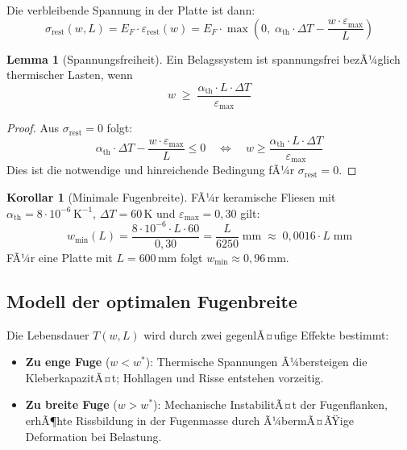 ﻿\documentclass[a4paper,12pt]{article}
\theoremstyle{definition}
\newtheorem{lemma}{Lemma}
\newtheorem{korollar}{Korollar}
\begin{document}
Die verbleibende Spannung in der Platte ist dann:
\[
\sigma_{\text{rest}}(w, L) = E_F \cdot \varepsilon_{\text{rest}}(w)
= E_F \cdot \max\!\left(0,\;\alpha_{\text{th}} \cdot \Delta T - \frac{w \cdot \varepsilon_{\max}}{L}\right)
\]

\begin{lemma}[Spannungsfreiheit]
	\label{lem:spannungsfreiheit}
	Ein Belagssystem ist spannungsfrei bezÃ¼glich thermischer Lasten, wenn
	\[
	w \;\geq\; \frac{\alpha_{\text{th}} \cdot L \cdot \Delta T}{\varepsilon_{\max}}
	\]
\end{lemma}

\begin{proof}
	Aus $\sigma_{\text{rest}} = 0$ folgt:
	\[
	\alpha_{\text{th}} \cdot \Delta T - \frac{w \cdot \varepsilon_{\max}}{L} \leq 0
	\quad\Longleftrightarrow\quad
	w \geq \frac{\alpha_{\text{th}} \cdot L \cdot \Delta T}{\varepsilon_{\max}}
	\]
	Dies ist die notwendige und hinreichende Bedingung fÃ¼r
	$\sigma_{\text{rest}} = 0$.
\end{proof}

\begin{korollar}[Minimale Fugenbreite]
	\label{kor:minbreite}
	FÃ¼r keramische Fliesen mit $\alpha_{\text{th}} = 8 \cdot 10^{-6}\,\text{K}^{-1}$,
	$\Delta T = 60\,\text{K}$ und $\varepsilon_{\max} = 0{,}30$ gilt:
	\[
	w_{\min}(L) = \frac{8 \cdot 10^{-6} \cdot L \cdot 60}{0{,}30}
	= \frac{L}{6250}\;\text{mm} \;\approx\; 0{,}0016 \cdot L\;\text{mm}
	\]
	FÃ¼r eine Platte mit $L = 600\,\text{mm}$ folgt $w_{\min} \approx 0{,}96\,\text{mm}$.
\end{korollar}

\subsection{Modell der optimalen Fugenbreite}

Die Lebensdauer $T(w, L)$ wird durch zwei gegenlÃ¤ufige Effekte bestimmt:

\begin{itemize}
	\item \textbf{Zu enge Fuge} ($w < w^*$): Thermische Spannungen Ã¼bersteigen
	      die KleberkapazitÃ¤t; Hohllagen und Risse entstehen vorzeitig.
	\item \textbf{Zu breite Fuge} ($w > w^*$): Mechanische InstabilitÃ¤t der
	      Fugenflanken, erhÃ¶hte Rissbildung in der Fugenmasse durch
	      Ã¼bermÃ¤ÃŸige Deformation bei Belastung.
\end{itemize}
\end{document}
